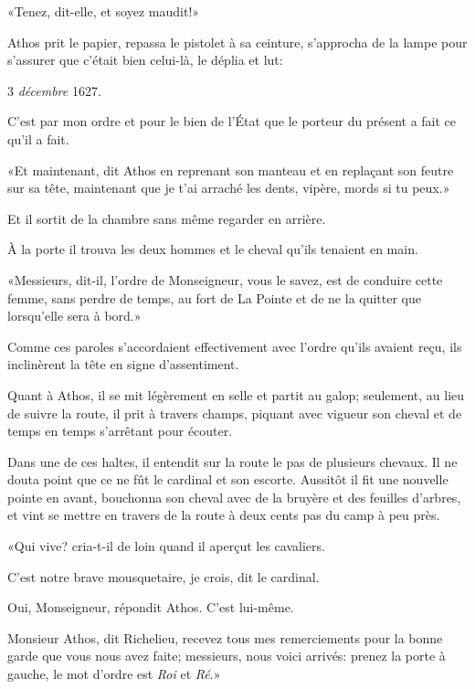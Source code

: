 «Tenez, dit-elle, et soyez maudit!» 

Athos prit le papier, repassa le pistolet à sa ceinture, s'approcha de la lampe pour s'assurer que c'était bien celui-là, le déplia et lut: 

\begin{mail}{3 \textit{décembre} 1627.}

C'est par mon ordre et pour le bien de l'État que le porteur du présent a fait ce qu'il a fait.
\end{mail}

«Et maintenant, dit Athos en reprenant son manteau et en replaçant son feutre sur sa tête, maintenant que je t'ai arraché les dents, vipère, mords si tu peux.» 

Et il sortit de la chambre sans même regarder en arrière. 

À la porte il trouva les deux hommes et le cheval qu'ils tenaient en main. 

«Messieurs, dit-il, l'ordre de Monseigneur, vous le savez, est de conduire cette femme, sans perdre de temps, au fort de La Pointe et de ne la quitter que lorsqu'elle sera à bord.» 

Comme ces paroles s'accordaient effectivement avec l'ordre qu'ils avaient reçu, ils inclinèrent la tête en signe d'assentiment. 

Quant à Athos, il se mit légèrement en selle et partit au galop; seulement, au lieu de suivre la route, il prit à travers champs, piquant avec vigueur son cheval et de temps en temps s'arrêtant pour écouter. 

Dans une de ces haltes, il entendit sur la route le pas de plusieurs chevaux. Il ne douta point que ce ne fût le cardinal et son escorte. Aussitôt il fit une nouvelle pointe en avant, bouchonna son cheval avec de la bruyère et des feuilles d'arbres, et vint se mettre en travers de la route à deux cents pas du camp à peu près. 

«Qui vive? cria-t-il de loin quand il aperçut les cavaliers. 

\speak  C'est notre brave mousquetaire, je crois, dit le cardinal. 

\speak  Oui, Monseigneur, répondit Athos. C'est lui-même. 

\speak  Monsieur Athos, dit Richelieu, recevez tous mes remerciements pour la bonne garde que vous nous avez faite; messieurs, nous voici arrivés: prenez la porte à gauche, le mot d'ordre est \textit{Roi} et \textit{Ré}.» 

